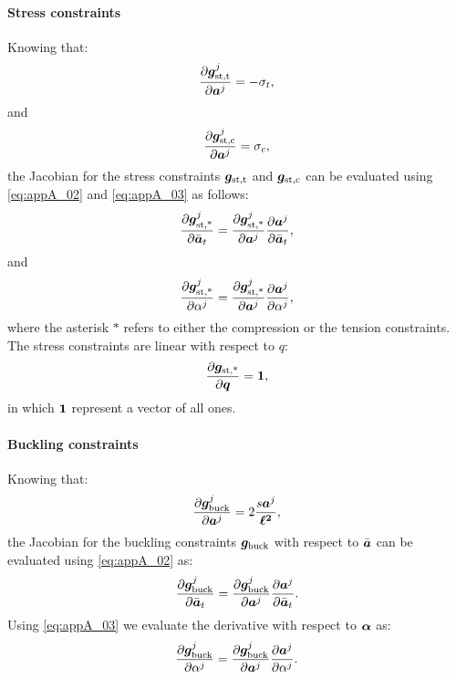 \paragraph*{Stress constraints}
Knowing that:
\begin{equation}
    \frac{\partial\bm{g}_\text{st,t}^j}{\partial{\bm{a}^j}} = -\sigma_t,
\end{equation}
and
\begin{equation}
    \frac{\partial\bm{g}_\text{st,c}^j}{\partial{\bm{a}^j}} = \sigma_c,
\end{equation}
the Jacobian for the stress constraints $\bm{g}_\text{st,t}$ and $\bm{g}_\text{st,c}$ can be evaluated using \eqref{eq:appA_02} and \eqref{eq:appA_03} as follows:
\begin{equation}
    \frac{\partial\bm{g}_\text{st,*}^j}{\partial\bar{\bm{a}}_t} = \frac{\partial\bm{g}_\text{st,*}^j}{\partial{\bm{a}^j}} \frac{\partial\bm{a}^j}{\partial\bar{\bm{a}}_t},
\end{equation}
and
\begin{equation}
    \frac{\partial\bm{g}_\text{st,*}^j}{\partial\alpha^j}=\frac{\partial\bm{g}_\text{st,*}^j}{\partial\bm{a}^j} \frac{\partial\bm{a}^j}{\partial\alpha^j},
\end{equation} 
where the asterisk $*$ refers to either the compression or the tension constraints. The stress constraints are linear with respect to $q$:
\begin{equation}
    \frac{\partial\bm{g}_\text{st,*}}{\partial\bm{q}}=\bm{1},
\end{equation}
in which $\bm{1}$ represent a vector of all ones.
\paragraph*{Buckling constraints} Knowing that:
\begin{equation}
    \frac{\partial\bm{g}_\text{buck}^j}{\partial\bm{a}^j} =  2\frac{s\bm{a}^j}{\bm{\ell^2}},
\end{equation}
the Jacobian for the buckling constraints $\bm{g}_\text{buck}$ with respect to $\bar{\bm{a}}$ can be evaluated using \eqref{eq:appA_02} as:
\begin{equation}
    \frac{\partial\bm{g}_\text{buck}^j}{\partial\bar{\bm{a}}_t} = \frac{\partial\bm{g}_\text{buck}^j}{\partial{\bm{a}^j}} \frac{\partial\bm{a}^j}{\partial\bar{\bm{a}}_t}.
\end{equation}
Using \eqref{eq:appA_03} we evaluate the derivative with respect to $\bm{\alpha}$ as:
\begin{equation}
    \frac{\partial\bm{g}_\text{buck}^j}{\partial\alpha^j}=\frac{\partial\bm{g}_\text{buck}^j}{\partial\bm{a}^j} \frac{\partial\bm{a}^j}{\partial\alpha^j}.
\end{equation}

